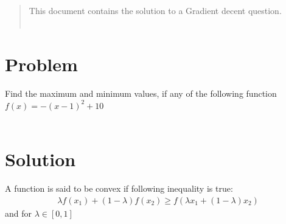 \begin{enumerate}[label=\thesection.\arabic*.,ref=\thesection.\theenumi]

\begin{abstract}
This document contains the solution to a Gradient decent question.\\ \\
\end{abstract}

\section{Problem}
    Find the maximum and minimum values, if any of the following function \\
    $f(x) = -(x-1)^2+10$ \\  \\
    
\section{Solution}

    A function is said to be convex if following inequality is true:
    \begin{align}
        \lambda f(x_1)+(1-\lambda) f(x_2) \geq f(\lambda x_1+(1-\lambda) x_2)
    \end{align}
    and for $\lambda \in [0,1]$
    
    
    

\end{enumerate}
